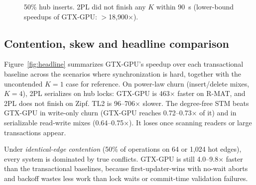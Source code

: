 \documentclass[sigconf,nonacm]{acmart}
\newcommand{\sys}{GTX-GPU}
\begin{document}
\begin{figure}[t]
\centering
{}
\caption{50\% hub inserts. 2PL did not finish any $K$ within 90~s (lower-bound speedups of \sys{}:
$>$18,900$\times$).}
\label{fig:ksweep-h}
\end{figure}

\subsection{Contention, skew and headline comparison}
Figure~\ref{fig:headline} summarizes \sys{}'s speedup over each transactional baseline across the scenarios where
synchronization is hard, together with the uncontended $K{=}1$ case for reference. On power-law churn
(insert/delete mixes, $K{=}4$), 2PL serializes on hub locks: \sys{} is 463$\times$ faster on R-MAT, and 2PL does
not finish on Zipf. TL2 is 96--706$\times$ slower. The degree-free STM beats \sys{} in write-only churn (\sys{} reaches
0.72--0.73$\times$ of it) and in serializable read-write mixes (0.64--0.75$\times$). It loses once scanning readers or
large transactions appear.

Under \emph{identical-edge contention} (50\% of operations on 64 or 1,024 hot edges), every system is dominated by
true conflicts. \sys{} is still 4.0--9.8$\times$ faster than the transactional baselines, because
first-updater-wins with no-wait aborts and backoff wastes less work than lock waits or commit-time validation
failures.
\end{document}
